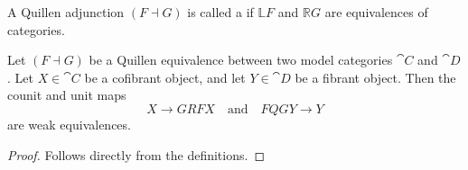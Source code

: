 \begin{definition}
    A Quillen adjunction $(F\dashv G)$
    is called a  if
    $\mathbb LF$ and $\mathbb RG$ are equivalences of categories.
\end{definition}

\begin{proposition}\label{thm-2-z}
    Let $(F\dashv G)$ be a Quillen equivalence
    between two model categories $\cat C$ and $\cat D$.
    Let $X\in\cat C$ be a cofibrant object,
    and let $Y\in\cat D$ be a fibrant object.
    Then the counit and unit maps 
    \[ X\to GRFX\quad\text{and}\quad FQGY\to Y \]
    are weak equivalences.
\end{proposition}

\begin{proof}
    Follows directly from the definitions.
\end{proof}
